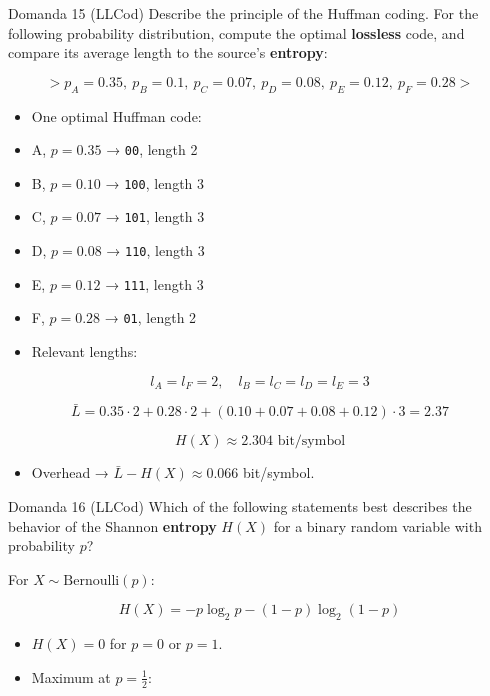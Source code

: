 \begin{questionbox}{Domanda 15}
(LLCod) Describe the principle of the Huffman coding. For the following probability distribution, compute the optimal \textbf{lossless} code, and compare its average length to the source’s \textbf{entropy}:
\end{questionbox}

$$
> p_A=0.35,\ p_B=0.1,\ p_C=0.07,\ p_D=0.08,\ p_E=0.12,\ p_F=0.28
> $$


\begin{itemize}
  \item One optimal Huffman code:
  \item A, $p=0.35$ → \texttt{00}, length 2
  \item B, $p=0.10$ → \texttt{100}, length 3
  \item C, $p=0.07$ → \texttt{101}, length 3
  \item D, $p=0.08$ → \texttt{110}, length 3
  \item E, $p=0.12$ → \texttt{111}, length 3
  \item F, $p=0.28$ → \texttt{01}, length 2
  \item Relevant lengths:
\end{itemize}


$$
l_A=l_F=2,\quad l_B=l_C=l_D=l_E=3
$$



$$
\bar{L}=0.35\cdot2+0.28\cdot2+(0.10+0.07+0.08+0.12)\cdot3=2.37
$$



$$
H(X)\approx 2.304 \text{ bit/symbol}
$$


\begin{itemize}
  \item Overhead → $\bar{L}-H(X)\approx0.066$ bit/symbol.
\end{itemize}



\begin{questionbox}{Domanda 16}
(LLCod) Which of the following statements best describes the behavior of the Shannon \textbf{entropy} $H(X)$ for a binary random variable with probability $p$?
\end{questionbox}


For $X\sim\text{Bernoulli}(p)$:


$$
H(X)=-p\log_2 p -(1-p)\log_2(1-p)
$$


\begin{itemize}
  \item $H(X)=0$ for $p=0$ or $p=1$.
  \item Maximum at $p=\frac12$:
\end{itemize}


